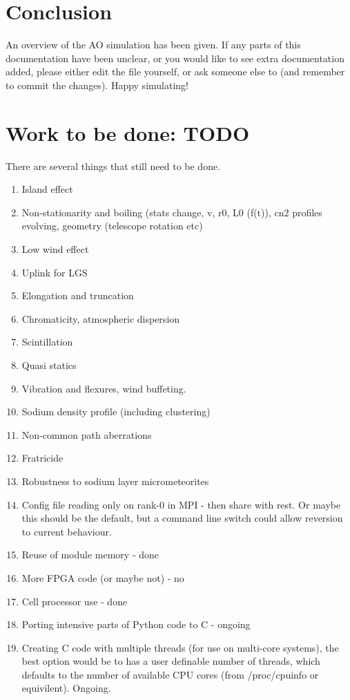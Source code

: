 \documentclass{article}
\begin{document}
\section{Conclusion}
An overview of the AO simulation has been given.  If any parts of this
documentation have been unclear, or you would like to see extra
documentation added, please either edit the file yourself, or ask
someone else to (and remember to commit the changes).  Happy
simulating!

\section{Work to be done: TODO}
There are several things that still need to be done.
\begin{enumerate}
\item Island effect
\item Non-stationarity and boiling (stats change, v, r0, L0 (f(t)),
  cn2 profiles evolving, geometry (telescope rotation etc)
\item Low wind effect
\item Uplink for LGS
\item Elongation and truncation
\item Chromaticity, atmospheric dispersion
\item Scintillation
\item Quasi statics
\item Vibration and flexures, wind buffeting.
\item Sodium density profile (including clustering)
\item Non-common path aberrations
\item Fratricide
\item Robustness to sodium layer micrometeorites
 
\item Config file reading only on rank-0 in MPI - then share with
  rest.  Or maybe this should be the default, but a command line
  switch could allow reversion to current behaviour.
\item Reuse of module memory - done
\item More FPGA code (or maybe not) - no
\item Cell processor use - done
\item Porting intensive parts of Python code to C - ongoing
\item Creating C code with multiple threads (for use on multi-core
  systems), the best option would be to has a user definable number of
  threads, which defaults to the number of available CPU cores (from
  /proc/cpuinfo or equivilent).  Ongoing.
\end{enumerate}
\end{document}
